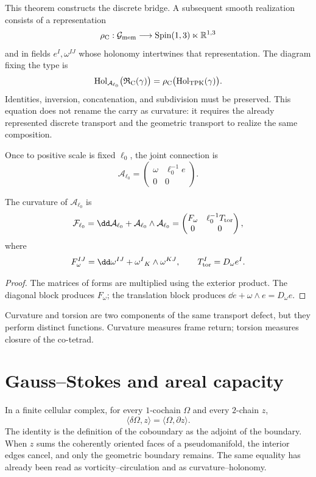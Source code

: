 This theorem constructs the discrete bridge. A subsequent smooth realization consists of a representation
\[
 \rho_{\rm C}:\mathcal G_{\rm mem}
 \longrightarrow\operatorname{Spin}(1,3)\ltimes\mathbb R^{1,3}
\]
and in fields \(e^I,\omega^{IJ}\) whose holonomy intertwines that representation.
The diagram fixing the type is
\[
 \operatorname{Hol}_{\mathcal A_{\ell_0}}
   \bigl(\mathfrak R_{\rm C}(\gamma)\bigr)
 =
 \rho_{\rm C}\bigl(\operatorname{Hol}_{\rm TPK}(\gamma)\bigr).
\]
Identities, inversion, concatenation, and subdivision must be preserved.  This
equation does not rename the carry as curvature: it requires the already represented
discrete transport and the geometric transport to realize the same composition.

Once to positive scale is fixed \(\ell_0\), the joint connection is
\[
 \mathcal A_{\ell_0}
 =
 \begin{pmatrix}
 \omega&\ell_0^{-1}e\\
 0&0
 \end{pmatrix}.
\]

\begin{proposition}
\label{prop:curvatura-conjunta-cartan-rev6}
The curvature of \(\mathcal A_{\ell_0}\) is
\[
 \mathcal F_{\ell_0}
 =\dd\mathcal A_{\ell_0}
  +\mathcal A_{\ell_0}\wedge\mathcal A_{\ell_0}
 =
 \begin{pmatrix}
 F_\omega&\ell_0^{-1}T_{\rm tor}\\
 0&0
 \end{pmatrix},
\]
where
\[
 F_\omega^{IJ}
 =\dd\omega^{IJ}+\omega^I{}_K\wedge\omega^{KJ},
 \qquad
 T_{\rm tor}^{I}=D_\omega e^I.
\]
\end{proposition}

\begin{proof}
The matrices of forms are multiplied using the exterior product.  The
diagonal block produces \(F_\omega\); the translation block produces
\(\dd e+\omega\wedge e=D_\omega e\).
\end{proof}

Curvature and torsion are two components of the same transport defect,
but they perform distinct functions.  Curvature measures frame return;
torsion measures closure of the co-tetrad.

\section{Gauss--Stokes and areal capacity}

In a finite cellular complex, for every \(1\)-cochain \(\Omega\) and every
\(2\)-chain \(z\),
\[
 \boxed{\quad
 \langle\delta\Omega,z\rangle
 =\langle\Omega,\partial z\rangle.
 \quad}
\]
The identity is the definition of the coboundary as the adjoint of the boundary.
When \(z\) sums the coherently oriented faces of a
pseudomanifold, the interior edges cancel, and only the geometric
boundary remains.  The same equality has already been read as
vorticity--circulation and as curvature--holonomy.

